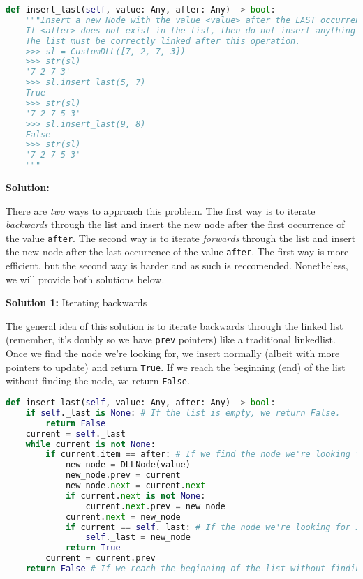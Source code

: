 \documentclass{article}
\begin{document}
  \begin{lstlisting}[language=Python, style=mystyle]
def insert_last(self, value: Any, after: Any) -> bool:
    """Insert a new Node with the value <value> after the LAST occurrence of the value <after> in this list.
    If <after> does not exist in the list, then do not insert anything and return False.
    The list must be correctly linked after this operation.
    >>> sl = CustomDLL([7, 2, 7, 3])
    >>> str(sl) 
    '7 2 7 3'
    >>> sl.insert_last(5, 7)
    True
    >>> str(sl)
    '7 2 7 5 3'
    >>> sl.insert_last(9, 8)
    False
    >>> str(sl)
    '7 2 7 5 3'
    """
\end{lstlisting}

\textbf{Solution:}

There are \textit{two} ways to approach this problem. The first way is to iterate \textit{backwards} through the list and insert the new node after the first occurrence of the value \texttt{after}. The second way is to iterate \textit{forwards} through the list and insert the new node after the last occurrence of the value \texttt{after}. The first way is more efficient, but the second way is harder and as such is reccomended. Nonetheless, we will provide both solutions below.

\textbf{Solution 1:} Iterating backwards

The general idea of this solution is to iterate backwards through the linked list (remember, it's doubly so we have \texttt{prev} pointers) like a traditional linkedlist. Once we find the node we're looking for, we insert normally (albeit with more pointers to update) and return \texttt{True}. If we reach the beginning (end) of the list without finding the node, we return \texttt{False}.

\begin{lstlisting}[language=Python, style=mystyle]
def insert_last(self, value: Any, after: Any) -> bool:
    if self._last is None: # If the list is empty, we return False.
        return False
    current = self._last
    while current is not None:
        if current.item == after: # If we find the node we're looking for, we insert the new node after it.
            new_node = DLLNode(value)
            new_node.prev = current
            new_node.next = current.next
            if current.next is not None:
                current.next.prev = new_node
            current.next = new_node
            if current == self._last: # If the node we're looking for is the last node, we update the last pointer.
                self._last = new_node
            return True
        current = current.prev
    return False # If we reach the beginning of the list without finding the node, we return False.
\end{lstlisting}
\end{document}
